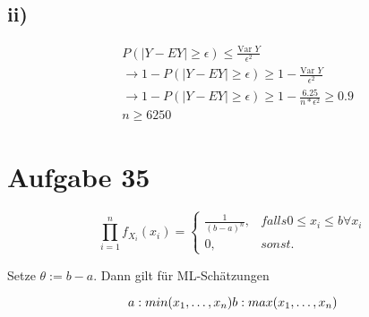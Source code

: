 \documentclass{article}
\begin{document}
		\subsection*{ii)}
			\begin{align*}
				&P(|Y-EY|\geq \epsilon ) \leq \frac{\text{Var }Y}{\epsilon^2}\\
				&\rightarrow 1-P(|Y-EY|\geq \epsilon) \geq 1 - \frac{\text{Var }Y}{\epsilon^2}\\
				&\rightarrow 1-P(|Y-EY|\geq \epsilon) \geq 1 - \frac{6.25}{n*\epsilon^2} \geq 0.9\\
				&n\geq 6250
			\end{align*}

	\section*{Aufgabe 35}
		\[
			\prod^n_{i=1} f_{X_i}(x_i) = 
					\begin{cases} 
						\frac{1}{(b-a)^n} ,&falls 0\leq x_i \leq b \forall x_i\\
						0 ,&sonst.
					\end{cases}
		\]

		Setze $\theta := b-a $. Dann gilt für ML-Schätzungen 

		\[
			a  : min(x_1 , \dots , x_n)\\
			b  : max(x_1 , \dots , x_n)
		\] 
\end{document}
